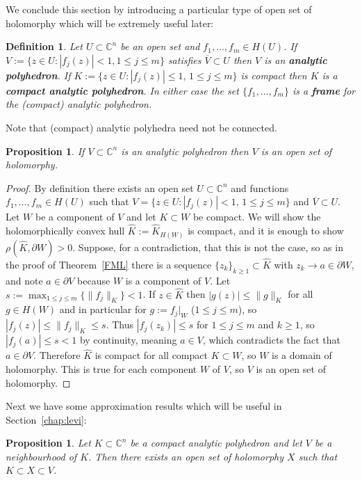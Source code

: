 \documentclass[11pt,a4paper, final, twoside]{article}
\newtheorem{definition}[theorem]{Definition}
\newtheorem{proposition}[theorem]{Proposition}
\numberwithin{equation}{section}
\newcommand{\C}{\mathbb C}
\newcommand{\clos}[1]{\overline{#1}}
\newcommand{\bd}{\partial}
\newcommand{\pmetric}{\rho}
\newcommand{\hol}{H}
\begin{document}
We conclude this section by introducing a particular type of open set of holomorphy which will be extremely useful later:
\begin{definition}
Let $U\subset\C^n$ be an open set and $f_1,\dots,f_m\in\hol(U)$. If $V:=\{z\in U\colon |f_j(z)|<1,1\leq j\leq m\}$ satisfies $\clos{V}\subset U$ then
$V$ is an \textbf{analytic polyhedron}. 
If $K:=\{z\in U\colon |f_j(z)|\leq 1,\,1\leq j\leq m\}$ is compact then $K$ is a \textbf{compact analytic polyhedron}. In either case the set $\{f_1,\dots,f_m\}$
is a \textbf{frame} for the (compact) analytic polyhedron.
\end{definition}
Note that (compact) analytic polyhedra need not be connected.
\begin{proposition}
\label{apolhol}
If $V\subset\C^n$ is an analytic polyhedron then $V$ is an open set of holomorphy.
\end{proposition}
\begin{proof}
By definition there exists an open set $U\subset\C^n$ and functions $f_1,\dots,f_m\in\hol(U)$ such that $V=\{z\in U\colon |f_j(z)|<1,\,1\leq j\leq m\}$
and $\clos{V}\subset U$. Let $W$ be a component of $V$ and let $K\subset W$ be compact. We will show the holomorphically convex hull $\hat K:=\hat K_{\hol(W)}$ is compact, and it
is enough to show $\pmetric(\hat K,\bd W)>0$.
Suppose, for a contradiction, that this is not the case, so as in the proof of Theorem~\ref{FML} 
there is a sequence $\{z_k\}_{k\geq 1}\subset \hat K$ with $z_k\to a\in\bd W$, and note $a\in\bd V$ because $W$
is a component of $V$.
Let $s:=\max_{1\leq j\leq m}\{\|f_j\|_K\}<1$.
If $z\in\hat K$ then $|g(z)|\leq \|g\|_K$ for all $g\in\hol(W)$ and in particular for $g:=f_j\big|_W$ ($1\leq j\leq m$), so $|f_j(z)|\leq \|f_j\|_K\leq s$.
Thus $|f_j(z_k)|\leq s$ for $1\leq j\leq m$ and $k\geq 1$, so $|f_j(a)|\leq s<1$ by continuity, meaning $a\in V$, which contradicts the fact that $a\in\bd V$. 
Therefore $\hat K$ is compact for all compact
$K\subset W$, so $W$ is a domain of holomorphy. This is true for each component $W$ of $V$, so $V$ is an open set of holomorphy.
\end{proof}
Next we have some approximation results which will be useful in Section~\ref{chap:levi}:
\begin{proposition}
\label{capolapprox}
Let $K\subset\C^n$ be a compact analytic polyhedron and let $V$ be a neighbourhood of $K$.
Then there exists an open set of holomorphy $X$ such that $K\subset X\subset V$.
\end{proposition}
\end{document}

